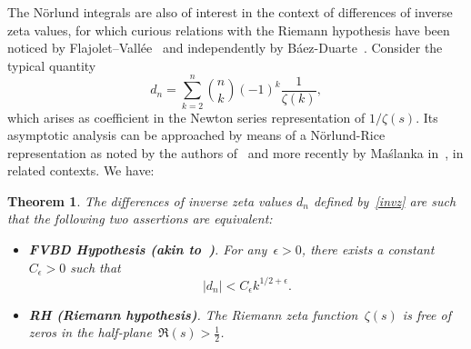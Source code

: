 \documentclass{amsart}
\newtheorem{theorem}{Theorem}
\begin{document}
\smallskip

The N\"orlund integrals are also of interest in the context of 
differences of inverse zeta values, for which curious relations
with the Riemann hypothesis have been noticed by Flajolet--Vall\'ee~\cite{FlVa00} and
independently by B\'aez-Duarte~\cite{Baez03b}. Consider the
typical quantity
\begin{equation}\label{invz}
d_n=\sum_{k=2}^n \binom{n}{k}(-1)^k \frac{1}{\zeta(k)},
\end{equation}
which arises as coefficient in the Newton series representation of $1/\zeta(s)$. 
Its asymptotic analysis can be approached by means of a N\"orlund-Rice representation
as noted by the authors of~\cite{FlVa00} and more recently by Ma\'slanka in~\cite{Maslanka06},
in related contexts.
We have:
\begin{theorem} The differences of inverse zeta values $d_n$ defined by~\eqref{invz} are such that
the following two assertions are equivalent: 
\begin{itemize}
\item[]{\bf FVBD  Hypothesis (akin to~\cite{Baez03b,FlVa00})}. For any~$\epsilon>0$, there exists a constant $C_\epsilon>0$ such that
\[
|d_n|<C_\epsilon k^{1/2+\epsilon}.
\]
\item[]{\bf RH (Riemann hypothesis)}. The Riemann 
zeta function~$\zeta(s)$ is free of zeros in the half-plane~$\Re(s)>\frac12$.
\end{itemize}
\end{theorem}
\end{document}
